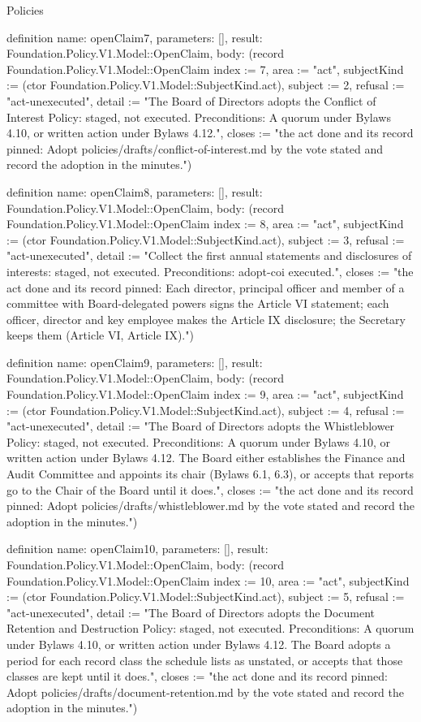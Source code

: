 \begin{lexlean}{Policies}
\begin{semanticmodule}
definition{
  name: openClaim7,
  parameters: [],
  result: Foundation.Policy.V1.Model::OpenClaim,
  body: (record Foundation.Policy.V1.Model::OpenClaim {index := 7, area := "act", subjectKind := (ctor Foundation.Policy.V1.Model::SubjectKind.act), subject := 2, refusal := "act-unexecuted", detail := "The Board of Directors adopts the Conflict of Interest Policy: staged, not executed. Preconditions: A quorum under Bylaws 4.10, or written action under Bylaws 4.12.", closes := "the act done and its record pinned: Adopt policies/drafts/conflict-of-interest.md by the vote stated and record the adoption in the minutes."})
}

definition{
  name: openClaim8,
  parameters: [],
  result: Foundation.Policy.V1.Model::OpenClaim,
  body: (record Foundation.Policy.V1.Model::OpenClaim {index := 8, area := "act", subjectKind := (ctor Foundation.Policy.V1.Model::SubjectKind.act), subject := 3, refusal := "act-unexecuted", detail := "Collect the first annual statements and disclosures of interests: staged, not executed. Preconditions: adopt-coi executed.", closes := "the act done and its record pinned: Each director, principal officer and member of a committee with Board-delegated powers signs the Article VI statement; each officer, director and key employee makes the Article IX disclosure; the Secretary keeps them (Article VI, Article IX)."})
}

definition{
  name: openClaim9,
  parameters: [],
  result: Foundation.Policy.V1.Model::OpenClaim,
  body: (record Foundation.Policy.V1.Model::OpenClaim {index := 9, area := "act", subjectKind := (ctor Foundation.Policy.V1.Model::SubjectKind.act), subject := 4, refusal := "act-unexecuted", detail := "The Board of Directors adopts the Whistleblower Policy: staged, not executed. Preconditions: A quorum under Bylaws 4.10, or written action under Bylaws 4.12. The Board either establishes the Finance and Audit Committee and appoints its chair (Bylaws 6.1, 6.3), or accepts that reports go to the Chair of the Board until it does.", closes := "the act done and its record pinned: Adopt policies/drafts/whistleblower.md by the vote stated and record the adoption in the minutes."})
}

definition{
  name: openClaim10,
  parameters: [],
  result: Foundation.Policy.V1.Model::OpenClaim,
  body: (record Foundation.Policy.V1.Model::OpenClaim {index := 10, area := "act", subjectKind := (ctor Foundation.Policy.V1.Model::SubjectKind.act), subject := 5, refusal := "act-unexecuted", detail := "The Board of Directors adopts the Document Retention and Destruction Policy: staged, not executed. Preconditions: A quorum under Bylaws 4.10, or written action under Bylaws 4.12. The Board adopts a period for each record class the schedule lists as unstated, or accepts that those classes are kept until it does.", closes := "the act done and its record pinned: Adopt policies/drafts/document-retention.md by the vote stated and record the adoption in the minutes."})
}


\end{semanticmodule}
\end{lexlean}
